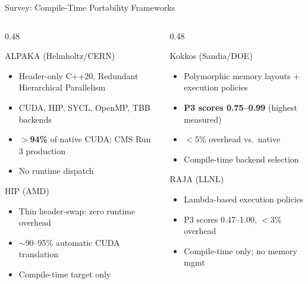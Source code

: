 \documentclass[aspectratio=169,10pt]{beamer}
\begin{document}
\begin{frame}{Survey: Compile-Time Portability Frameworks}
  \begin{columns}[T]
    \begin{column}{0.48\textwidth}
      \begin{block}{ALPAKA (Helmholtz/CERN)}
        \begin{itemize}\itemsep0pt
          \item Header-only C++20, Redundant Hierarchical Parallelism
          \item CUDA, HIP, SYCL, OpenMP, TBB backends
          \item \textbf{$>$94\%} of native CUDA; CMS Run 3 production
          \item \textcolor{codered}{No runtime dispatch}
        \end{itemize}
      \end{block}
      \begin{block}{HIP (AMD)}
        \begin{itemize}\itemsep0pt
          \item Thin header-swap: zero runtime overhead
          \item $\sim$90--95\% automatic CUDA translation
          \item \textcolor{codered}{Compile-time target only}
        \end{itemize}
      \end{block}
    \end{column}
    \begin{column}{0.48\textwidth}
      \begin{block}{Kokkos (Sandia/DOE)}
        \begin{itemize}\itemsep0pt
          \item Polymorphic memory layouts + execution policies
          \item \textbf{P3 scores 0.75--0.99} (highest measured)
          \item $<$5\% overhead vs.\ native
          \item \textcolor{codered}{Compile-time backend selection}
        \end{itemize}
      \end{block}
      \begin{block}{RAJA (LLNL)}
        \begin{itemize}\itemsep0pt
          \item Lambda-based execution policies
          \item P3 scores 0.47--1.00, $<$3\% overhead
          \item \textcolor{codered}{Compile-time only; no memory mgmt}
        \end{itemize}
      \end{block}
    \end{column}
  \end{columns}
\end{frame}
\end{document}
